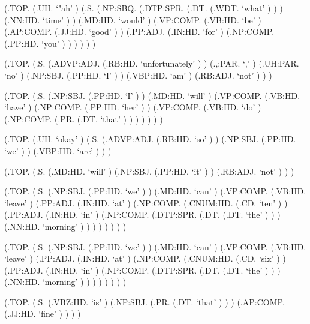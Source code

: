 \documentclass[10pt]{article}
\begin{document}
\begin{parsetree}  (.TOP. (.UH. `"ah' ) (.S. (.NP:SBQ. (.DTP:SPR. (.DT. (.WDT. `what' ) ) ) (.NN:HD. `time' ) ) (.MD:HD. `would' ) (.VP:COMP. (.VB:HD. `be' ) (.AP:COMP. (.JJ:HD. `good' ) ) (.PP:ADJ. (.IN:HD. `for' ) (.NP:COMP. (.PP:HD. `you' ) ) ) ) ) ) \end{parsetree}

\begin{parsetree}  (.TOP. (.S. (.ADVP:ADJ. (.RB:HD. `unfortunately' ) ) (.,:PAR. `,' ) (.UH:PAR. `no' ) (.NP:SBJ. (.PP:HD. `I' ) ) (.VBP:HD. `am' ) (.RB:ADJ. `not' ) ) ) \end{parsetree}

\begin{parsetree}  (.TOP. (.S. (.NP:SBJ. (.PP:HD. `I' ) ) (.MD:HD. `will' ) (.VP:COMP. (.VB:HD. `have' ) (.NP:COMP. (.PP:HD. `her' ) ) (.VP:COMP. (.VB:HD. `do' ) (.NP:COMP. (.PR. (.DT. `that' ) ) ) ) ) ) ) \end{parsetree}

\begin{parsetree}  (.TOP. (.UH. `okay' ) (.S. (.ADVP:ADJ. (.RB:HD. `so' ) ) (.NP:SBJ. (.PP:HD. `we' ) ) (.VBP:HD. `are' ) ) ) \end{parsetree}

\begin{parsetree}  (.TOP. (.S. (.MD:HD. `will' ) (.NP:SBJ. (.PP:HD. `it' ) ) (.RB:ADJ. `not' ) ) ) \end{parsetree}

\begin{parsetree}  (.TOP. (.S. (.NP:SBJ. (.PP:HD. `we' ) ) (.MD:HD. `can' ) (.VP:COMP. (.VB:HD. `leave' ) (.PP:ADJ. (.IN:HD. `at' ) (.NP:COMP. (.CNUM:HD. (.CD. `ten' ) ) (.PP:ADJ. (.IN:HD. `in' ) (.NP:COMP. (.DTP:SPR. (.DT. (.DT. `the' ) ) ) (.NN:HD. `morning' ) ) ) ) ) ) ) ) \end{parsetree}

\begin{parsetree}  (.TOP. (.S. (.NP:SBJ. (.PP:HD. `we' ) ) (.MD:HD. `can' ) (.VP:COMP. (.VB:HD. `leave' ) (.PP:ADJ. (.IN:HD. `at' ) (.NP:COMP. (.CNUM:HD. (.CD. `six' ) ) (.PP:ADJ. (.IN:HD. `in' ) (.NP:COMP. (.DTP:SPR. (.DT. (.DT. `the' ) ) ) (.NN:HD. `morning' ) ) ) ) ) ) ) ) \end{parsetree}

\begin{parsetree}  (.TOP. (.S. (.VBZ:HD. `is' ) (.NP:SBJ. (.PR. (.DT. `that' ) ) ) (.AP:COMP. (.JJ:HD. `fine' ) ) ) ) \end{parsetree}
\end{document}
